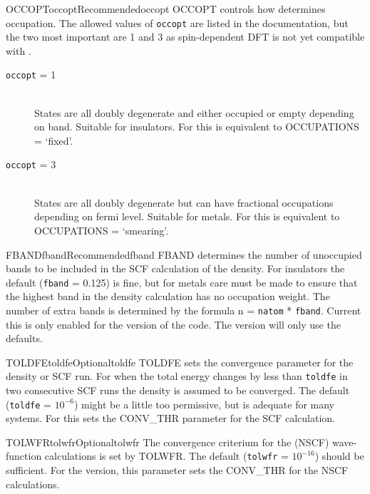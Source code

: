 \documentclass[11pt]{report}
\begin{document}
\begin{Card}{OCCOPT}{occopt}{Recommended}{occopt}
OCCOPT controls how  determines occupation. The allowed values of \texttt{occopt} are listed in the  documentation, but the two most important are 1 and 3 as spin-dependent DFT is not yet compatible with .
\begin{description}
\item[\texttt{occopt} = 1]\hfill\\ States are all doubly degenerate and either occupied or empty depending on band. Suitable for insulators. 
	For  this is equivalent to  OCCUPATIONS = `fixed'.
\item[\texttt{occopt} = 3]\hfill\\ States are all doubly degenerate but can have fractional occupations depending on fermi level. Suitable for metals. For  this is equivalent to OCCUPATIONS = `smearing'. 
\end{description}
\end{Card}

\begin{Card}{FBAND}{fband}{Recommended}{fband}
FBAND determines the number of unoccupied bands to be included in the SCF calculation of the density. For insulators the default (\texttt{fband} = 0.125) is fine, but for metals care must be made to ensure that the highest band in the density calculation has no occupation weight. The number of extra bands is determined by the formula n = \texttt{natom} * \texttt{fband}. Current this is only enabled for the  version of the code. The  version will only use the defaults. 
\end{Card}


\begin{Card}{TOLDFE}{toldfe}{Optional}{toldfe}
TOLDFE sets the convergence parameter for the density or SCF run. For  when the total energy changes by less than \texttt{toldfe} in two consecutive SCF runs the density is assumed to be converged. The default (\texttt{toldfe} = $10^{-6}$) might be a little too permissive, but is adequate for many systems. For  this sets the CONV\_THR parameter for the SCF calculation. 
\end{Card}

\begin{Card}{TOLWFR}{tolwfr}{Optional}{tolwfr}
The convergence criterium for the (NSCF) wave-function calculations is set by TOLWFR. The default (\texttt{tolwfr} = $10^{-16}$) should be sufficient. For the  version, this parameter sets the CONV\_THR for the NSCF calculations. 
\end{Card}
\end{document}
